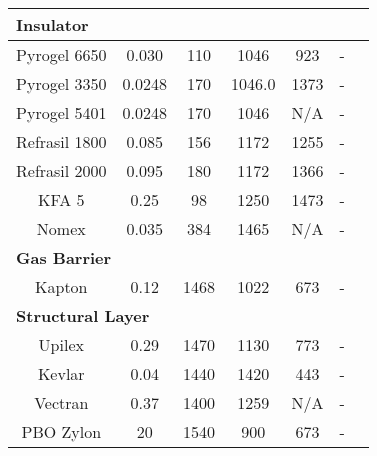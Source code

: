 \begin{table}[ht]
\begin{tabular}{|c|c|c|c|c|c|c|}
		\multicolumn{6}{|l|}{\textbf{Insulator}}			\\ \hline
		Pyrogel 6650      & 0.030                                                 & 110                                        & 1046                                            & 923    & - \\ \hline
		Pyrogel 3350      & 0.0248                                                & 170                                        & 1046.0                                         & 1373  	 & - \\ \hline
		Pyrogel 5401      & 0.0248                                                & 170                                        & 1046                                            & N/A  	 & - \\ \hline
		Refrasil 1800      & 0.085                                                 & 156                                        & 1172                                            & 1255 	 & - \\ \hline
		Refrasil 2000      & 0.095                                                 & 180                                        & 1172                                            & 1366 	 & - \\ \hline
		KFA 5             & 0.25                                                  & 98                                         & 1250                                            & 1473 	 & - \\ \hline
		Nomex             & 0.035                                                  & 384                                         & 1465                                            & N/A 	 & - \\ \hline
		\multicolumn{6}{|l|}{\textbf{Gas Barrier}}			\\ \hline
		Kapton            & 0.12                                                  & 1468                                       & 1022                                            & 673	 & - \\ \hline
		\multicolumn{6}{|l|}{\textbf{Structural Layer}}			\\ \hline
		Upilex            & 0.29                                                  & 1470                                       & 1130                                            & 773 	 & - \\ \hline
		Kevlar            & 0.04 & 1440                                       & 1420                                            & 443 	 & - \\ \hline
		Vectran            & 0.37 & 1400 & 1259 & N/A 	 & -\\ \hline
		PBO Zylon			& 20			& 1540	& 900	& 673	& -\\ \hline
	\end{tabular}
	\label{tab:tpsmatprop2}
\end{table}
